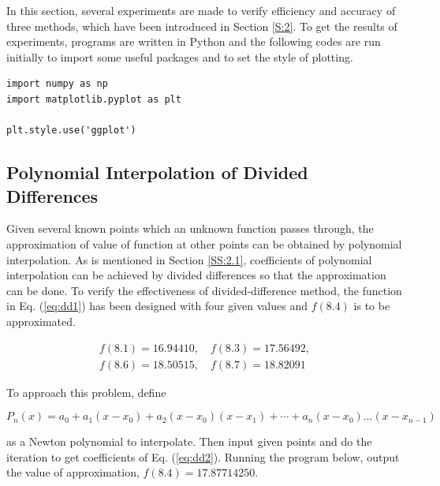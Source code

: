 \documentclass[preprint,12pt]{elsarticle}
\begin{document}
In this section, several experiments are made to verify efficiency and accuracy of three methods, which have been introduced in Section \ref{S:2}. To get the results of experiments, programs are written in Python and the following codes are run initially to import some useful packages and to set the style of plotting.

\begin{lstlisting}
import numpy as np
import matplotlib.pyplot as plt

plt.style.use('ggplot')
\end{lstlisting}

\subsection{Polynomial Interpolation of Divided Differences}

Given several known points which an unknown function passes through, the approximation of value of function at other points can be obtained by polynomial interpolation. As is mentioned in Section \ref{SS:2.1}, coefficients of polynomial interpolation can be achieved by divided differences so that the approximation can be done. To verify the effectiveness of divided-difference method, the function in Eq. (\ref{eq:dd1}) has been designed with four given values and $f(8.4)$ is to be approximated.

\begin{equation}
\label{eq:dd1}
\begin{split}
    f(8.1)=16.94410,\quad f(8.3)=17.56492,\\
    f(8.6)=18.50515,\quad f(8.7)=18.82091
\end{split}
\end{equation}

To approach this problem, define 

\begin{equation}
\label{eq:dd2}
    P_{n}(x)=a_{0}+a_{1}(x-x_0)+a_{2}(x-x_0)(x-x_1)+\cdots+a_{n}(x-x_0)\dots(x-x_{n-1})
\end{equation}

as a Newton polynomial to interpolate. Then input given points and do the iteration to get coefficients of Eq. (\ref{eq:dd2}). Running the program below, output the value of approximation, $f(8.4)=17.87714250$.
\end{document}
